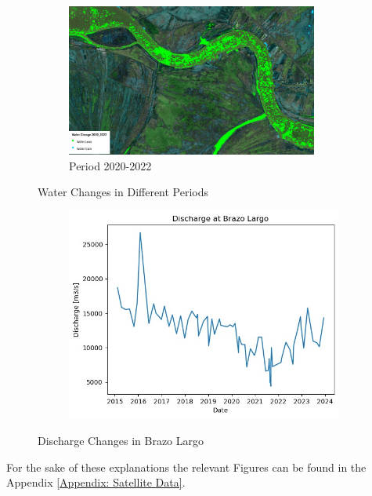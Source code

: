 \begin{figure}[H]
    \centering
    \begin{subfigure}[c]{0.6\textwidth}
        \includegraphics[width=\linewidth, height=5cm]{figures/ch5/2020-2022.jpg}
        \caption{Period 2020-2022}
        \label{fig:sontek}
    \end{subfigure}
    
    \caption{Water Changes in Different Periods}
    \label{fig:Water Changes}
\end{figure}

\begin{figure}[H]
    \centering
    \begin{subfigure}{0.48\textwidth}
        \includegraphics[width=\linewidth]{figures/ch5/dischargepeak.jpg}
    \end{subfigure}
    
    \caption{Discharge Changes in Brazo Largo}
    \label{fig:Discharge Changes in Brazo Largo}
\end{figure}


For the sake of these explanations the relevant Figures can be found in the Appendix \ref{Appendix: Satellite Data}.

